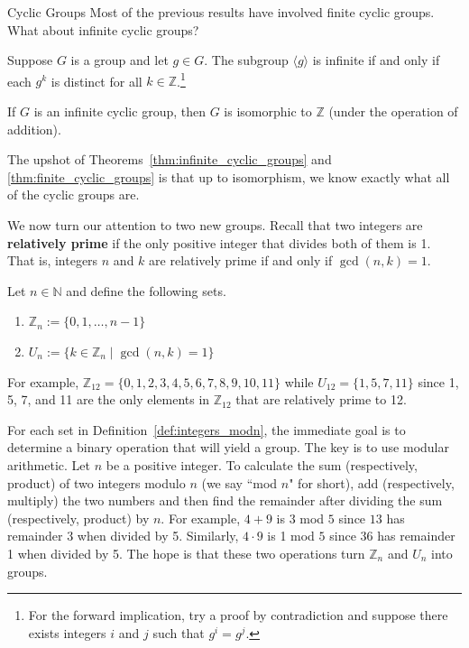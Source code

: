 \begin{section}{Cyclic Groups}
Most of the previous results have involved finite cyclic groups.  What about infinite cyclic groups?

\begin{theorem}
Suppose $G$ is a group and let $g\in G$. The subgroup $\langle g\rangle$ is infinite if and only if each $g^k$ is distinct for all $k\in\mathbb{Z}$.\footnote{For the forward implication, try a proof by contradiction and suppose there exists integers $i$ and $j$ such that $g^i=g^j$.}
\end{theorem}

\begin{theorem}\label{thm:infinite_cyclic_groups}
If $G$ is an infinite cyclic group, then $G$ is isomorphic to $\mathbb{Z}$ (under the operation of addition).
\end{theorem}

The upshot of Theorems~\ref{thm:infinite_cyclic_groups} and \ref{thm:finite_cyclic_groups} is that up to isomorphism, we know exactly what all of the cyclic groups are.

We now turn our attention to two new groups. Recall that two integers are \textbf{relatively prime} if the only positive integer that divides both of them is 1.  That is, integers $n$ and $k$ are relatively prime if and only if $\gcd(n,k)=1$.

\begin{definition}\label{def:integers_modn}
Let $n\in\mathbb{N}$ and define the following sets.
\begin{enumerate}[label=\textrm{(\alph*)}]
\item $\mathbb{Z}_n:=\{0,1,\ldots,n-1\}$
\item $U_n:=\{k\in\mathbb{Z}_n\mid \gcd(n,k)=1\}$
\end{enumerate}
\end{definition}

\begin{example}
For example, $\mathbb{Z}_{12}=\{0,1,2,3,4,5,6,7,8,9,10,11\}$ while $U_{12}=\{1,5,7,11\}$ since 1, 5, 7, and 11 are the only elements in $\mathbb{Z}_{12}$ that are relatively prime to 12.
\end{example}

For each set in Definition~\ref{def:integers_modn}, the immediate goal is to determine a binary operation that will yield a group.  The key is to use modular arithmetic.  Let $n$ be a positive integer. To calculate the sum (respectively, product) of two integers modulo $n$ (we say ``mod $n$" for short), add (respectively, multiply) the two numbers and then find the remainder after dividing the sum (respectively, product) by $n$. For example, $4+9$ is $3$ mod $5$ since $13$ has remainder 3 when divided by 5.  Similarly, $4\cdot 9$ is 1 mod $5$ since 36 has remainder 1 when divided by 5. The hope is that these two operations turn $\mathbb{Z}_n$ and $U_n$ into groups.


\end{section}
